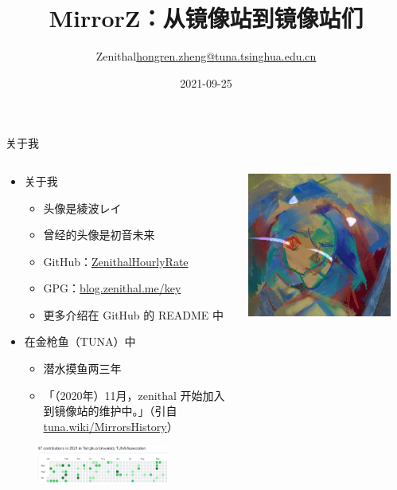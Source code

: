 \documentclass{ctexbeamer}
\title[Mirror\{S,Z\}]{MirrorZ：从镜像站到镜像站们}
\author[Zenithal]{Zenithal\newline\url{hongren.zheng@tuna.tsinghua.edu.cn}}
\date{2021-09-25}
\begin{document}
\begin{frame}
\titlepage
\end{frame}

\begin{frame}{关于我}
  \begin{columns}
    \begin{column}{0.65\textwidth}
      \begin{itemize}
        \item 关于我\begin{itemize}
          \item 头像是綾波レイ
          \item 曾经的头像是初音未来
          \item GitHub：\url{ZenithalHourlyRate}
          \item GPG：\url{blog.zenithal.me/key}
          \item 更多介绍在 GitHub 的 README 中
        \end{itemize}
        \item 在金枪鱼（TUNA）中\begin{itemize}
          \item 潜水摸鱼两三年
          \item 「（2020年）11月，zenithal 开始加入到镜像站的维护中。」（引自 \url{tuna.wiki/MirrorsHistory}）
        \end{itemize}
      \end{itemize}
      \begin{figure}
        \centering
        \includegraphics[width=0.8\textwidth]{img/contri.png}
      \end{figure}
    \end{column}
    \begin{column}{0.35\textwidth}
      \includegraphics[width=0.9\textwidth]{img/rei.jpg}

\end{column}
\end{columns}
\end{frame}
\end{document}
